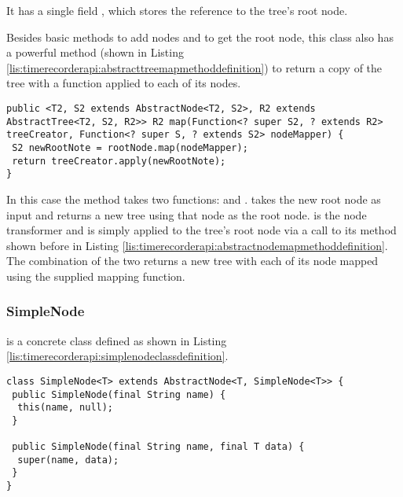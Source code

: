 \noindent It has a single field , which stores the reference to the tree's root node.

\noindent Besides basic methods to add nodes and to get the root node, this class also has a powerful  method (shown in Listing \ref{lis:timerecorderapi:abstracttreemapmethoddefinition}) to return a copy of the tree with a function applied to each of its nodes.

\noindent\begin{minipage}[c]{\linewidth}
\begin{lstlisting}[breaklines,caption={AbstractTree map method definition},label=lis:timerecorderapi:abstracttreemapmethoddefinition]
public <T2, S2 extends AbstractNode<T2, S2>, R2 extends AbstractTree<T2, S2, R2>> R2 map(Function<? super S2, ? extends R2> treeCreator, Function<? super S, ? extends S2> nodeMapper) {
 S2 newRootNote = rootNode.map(nodeMapper);
 return treeCreator.apply(newRootNote);
}
\end{lstlisting}
\end{minipage}

\noindent In this case the method takes two functions:  and .  takes the new root node as input and returns a new tree using that node as the root node.  is the node transformer and is simply applied to the tree's root node via a call to its  method shown before in Listing \ref{lis:timerecorderapi:abstractnodemapmethoddefinition}. The combination of the two returns a new tree with each of its node mapped using the supplied mapping function.

\subsubsection{SimpleNode}

 is a concrete class defined as shown in Listing \ref{lis:timerecorderapi:simplenodeclassdefinition}.

\noindent\begin{minipage}[c]{\linewidth}
\begin{lstlisting}[breaklines,caption={SimpleNode class definition},label=lis:timerecorderapi:simplenodeclassdefinition]
class SimpleNode<T> extends AbstractNode<T, SimpleNode<T>> {
 public SimpleNode(final String name) {
  this(name, null);
 }

 public SimpleNode(final String name, final T data) {
  super(name, data);
 }
}
\end{lstlisting}
\end{minipage}

